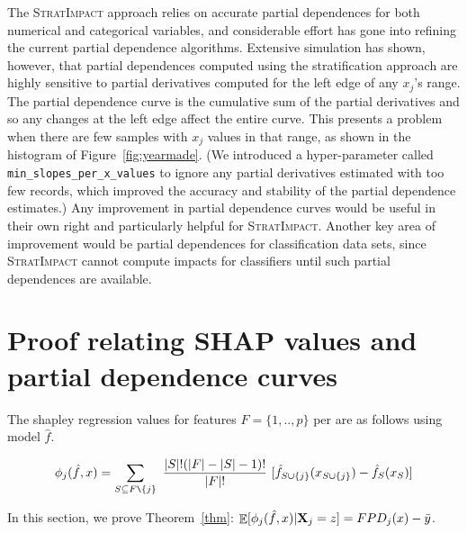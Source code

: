 \documentclass[11pt]{article}
\newcommand{\figref}[1]{Figure~\ref{#1}}
\newcommand{\thmref}[1]{Theorem~\ref{#1}}
\DeclareMathOperator{\Ex}{\mathbb{E}}
\newcommand{\simp}{\fontfamily{cmr}\textsc{\small StratImpact}}
\begin{document}
The \simp{} approach relies on accurate partial dependences for both numerical and categorical variables, and considerable effort has gone into refining the current partial dependence algorithms. Extensive simulation has shown, however, that partial dependences computed using the stratification approach are highly sensitive to partial derivatives computed for the left edge of any $x_j$'s range. The partial dependence curve is the cumulative sum of the partial derivatives and so any changes at the left edge affect the entire curve.  This presents a problem when there are few samples with $x_j$ values in that range, as shown in the histogram of \figref{fig:yearmade}. (We introduced a hyper-parameter called {\tt\small min\_slopes\_per\_x\_values} to ignore any partial derivatives estimated with too few records, which improved the accuracy and stability of the partial dependence estimates.)  Any improvement in partial dependence curves would be useful in their own right and particularly helpful for \simp.    Another key area of improvement would be partial dependences for classification data sets, since \simp{} cannot compute impacts for classifiers until such partial dependences are available.


\appendix

\section{Proof relating SHAP values and partial dependence curves}

The shapley regression values for features $F=\{1,..,p\}$ per \cite{shap} are as follows  using model $\hat{f}$.

\[
\phi_j(\hat{f},x) = \sum_{S \subseteq F \texttt{\char`\\} \{j\}}\
\frac{|S|!(|F|-|S|-1)!}{|F|!}\
 [ \hat{f}_{S \cup \{j\}}(x_{S \cup \{j\}}) - \hat{f}_S(x_S) ]
\]

\noindent In this section, we prove \thmref{thm}: $\Ex[ \phi_j(\hat{f},x) | {\bf X}_j = z] = FPD_j(x) - \bar{y}$.
\end{document}
